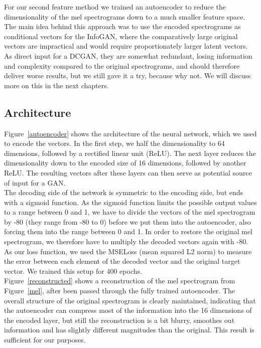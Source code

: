     For our second feature method we trained an autoencoder to reduce the dimensionality of the mel spectrograms down to a much smaller feature space.
    The main idea behind this approach was to use the encoded spectrograms as conditional vectors for the InfoGAN, where the comparatively large original vectors are impractical and would require proportionately larger latent vectors.
    As direct input for a DCGAN, they are somewhat redundant, losing information and complexity compared to the original spectrograms, and should therefore deliver worse results, but we still gave it a try, because why not.
    We will discuss more on this in the next chapters.\\

    \subsection{Architecture}
    \indent Figure~\ref{autoencoder} shows the architecture of the neural network, which we used to encode the vectors. In the first step, we half the dimensionality to 64 dimensions, followed by a rectified linear unit (ReLU).
    The next layer reduces the dimensionality down to the encoded size of 16 dimensions, followed by another ReLU. 
    The resulting vectors after these layers can then serve as potential source of input for a GAN.\\
    \indent The decoding side of the network is symmetric to the encoding side, but ends with a sigmoid function. 
    As the sigmoid function limits the possible output values to a range between 0 and 1, we have to divide the vectors of the mel spectrogram by -80 (they range from -80 to 0) before we put them into the autoencoder, also forcing them into the range between 0 and 1. 
    In order to restore the original mel spectrogram, we therefore have to multiply the decoded vectors again with -80.
    As our loss function, we used the MSELoss (mean squared L2 norm) to measure the error between each element of the decoded vector and the original target vector. 
    We trained this setup for 400 epochs.\\
    Figure~\ref{reconstructed} shows a reconstruction of the mel spectrogram from Figure~\ref{mel}, after been passed through the fully trained autoencoder.
    The overall structure of the original spectrogram is clearly maintained, indicating that the autoencoder can compress most of the information into the 16 dimensions of the encoded layer, but still the reconstruction is a bit blurry, smoothes out information and has slightly different magnitudes than the original.
    This result is sufficient for our purposes.

